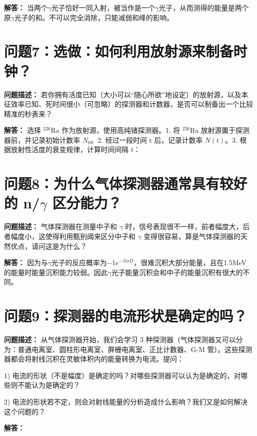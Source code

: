\documentclass{article}
\begin{document}
\textbf{解答：} 当两个$\gamma$光子恰好一同入射，被当作是一个$\gamma$光子，从而测得的能量是两个原$\gamma$光子的和。不可以完全消除，只能减弱和峰的影响。

\section{问题7：选做：如何利用放射源来制备时钟？}
\label{sec:prob7}

\textbf{问题描述：} 若你拥有活度已知（大小可以“随心所欲”地设定）的放射源，以及本征效率已知、死时间很小（可忽略）的探测器和计数器，是否可以制备出一个比较精准的秒表来？

\textbf{解答：} 选择 $^{226}$Ra 作为放射源，使用高纯锗探测器。1. 将 $^{226}$Ra 放射源置于探测器前，并记录初始计数率 $N_0$。2. 经过一段时间 t 后，记录计数率 $N(t)$。3. 根据放射性活度的衰变规律，计算时间间隔 $t$：

\section{问题8：为什么气体探测器通常具有较好的 n/$\gamma$ 区分能力？}
\label{sec:prob8}

\textbf{问题描述：} 气体探测器在测量中子和 $\gamma$ 时，信号表现很不一样，前者幅度大，后者幅度小，这使得利用甄别阈来区分中子和 $\gamma$ 变得很容易，算是气体探测器的天然优点，请问这是为什么？

\textbf{解答：} 因为与$\gamma$光子的反应概率为$-1e^{-N\sigma D}$，很难沉积大部分能量，且在1.5MeV的能量时能量沉积能力较弱。因此$\gamma$光子能量沉积会和中子的能量沉积有很大的不同。

\section{问题9：探测器的电流形状是确定的吗？}
\label{sec:prob9}

\textbf{问题描述：} 从气体探测器开始，我们会学习 3 种探测器（气体探测器又可以分为：普通电离室、圆柱形电离室、屏栅电离室、正比计数器、G-M 管）。这些探测器都会将射线沉积在灵敏体积内的能量转换为电流。提问：

1) 电流的形状（不是幅度）是确定的吗？对哪些探测器可以认为是确定的，对哪些则不能认为是确定的？

2) 电流的形状若不定，则会对射线能量的分析造成什么影响？我们又是如何解决这个问题的？

\textbf{解答：}
\end{document}
